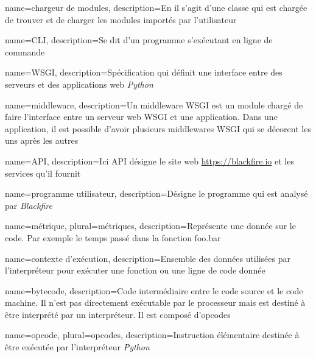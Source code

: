 {
  name=chargeur de modules,
  description={En \Python il s'agit d'une classe qui est chargée de trouver et de charger les modules importés par l'utilisateur}
}

{
  name=CLI,
  description=Se dit d'un programme s'exécutant en ligne de commande
}

{
  name=WSGI,
  description=Spécification qui définit une interface entre des serveurs et des applications web \emph{Python}
}

{
  name=middleware,
  description=Un middleware WSGI est un module \Python chargé de faire l'interface entre un serveur web WSGI et une application. Dans une application, il est possible d'avoir plusieurs middlewares WSGI qui se décorent les uns après les autres
}

{
  name=API,
  description=Ici API désigne le site web \url{https://blackfire.io} et les services qu'il fournit
}

{
  name=programme utilisateur,
  description=Désigne le programme qui est analysé par \emph{Blackfire}
}

{
  name=métrique,
  plural=métriques,
  description=Représente une donnée sur le code. Par exemple le temps passé dans la fonction foo.bar
}
 
{
  name=contexte d'exécution,
  description=Ensemble des données utilisées par l'interpréteur \Python pour exécuter une fonction ou une ligne de code donnée
}
 
{
  name=bytecode,
  description=Code intermédiaire entre le code source et le code machine. Il n'est pas directement exécutable par le processeur mais est destiné à être interprété par un interpréteur. Il est composé d'opcodes
}
 
{
  name=opcode,
  plural=opcodes,
  description=Instruction élémentaire destinée à être exécutée par l'interpréteur \emph{Python}
}